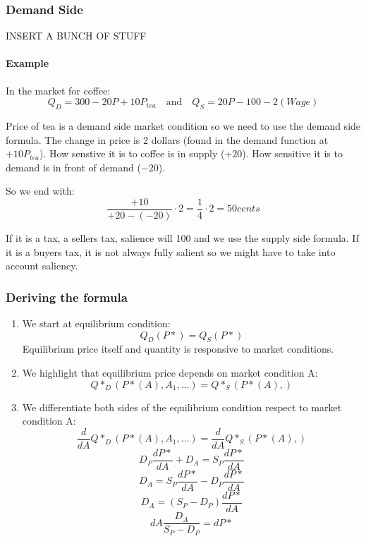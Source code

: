 \documentclass[
]{book}
\providecommand{\tightlist}{%
  \setlength{\itemsep}{0pt}\setlength{\parskip}{0pt}}
\begin{document}
\hypertarget{demand-side}{%
\subsubsection{Demand Side}\label{demand-side}}

INSERT A BUNCH OF STUFF

\hypertarget{example}{%
\paragraph{Example}\label{example}}

In the market for coffee:
\[Q_D = 300 - 20P + 10P_{tea} \quad \text{and} \quad Q_S = 20P-100 - 2(Wage)\]

Price of tea is a demand side market condition so we need to use the demand side formula. The change in price is 2 dollars (found in the demand function at \(+10P_{tea}\)). How senstive it is to coffee is in supply (\(+20\)). How sensitive it is to demand is in front of demand (\(-20\)).

So we end with: \[\frac{+10}{+20 - (-20)}\cdot 2 = \frac{1}{4} \cdot 2 = 50 cents\]

If it is a tax, a sellers tax, salience will 100 and we use the supply side formula. If it is a buyers tax, it is not always fully salient so we might have to take into account saliency.

\hypertarget{deriving-the-formula}{%
\subsubsection{Deriving the formula}\label{deriving-the-formula}}

\begin{enumerate}
\def\labelenumi{\arabic{enumi}.}
\tightlist
\item
  We start at equilibrium condition:
  \[Q_D(P*) = Q_S(P*)\]
  Equilibrium price itself and quantity is responsive to market conditions.
\item
  We highlight that equilibrium price depends on market condition A: \[Q*_D(P*(A),A_1,...) = Q*_S(P*(A),)\]
\item
  We differentiate both sides of the equilibrium condition respect to market condition A: \[ \frac{d}{dA} Q*_D(P*(A),A_1,...) = \frac{d}{dA} Q*_S(P*(A),)\]
  \[D_P \frac{dP*}{dA} + D_A =  S_P \frac{dP*}{dA}\]
  \[D_A =  S_P \frac{dP*}{dA} - D_P \frac{dP*}{dA}\]
  \[D_A = (S_P - D_P)\frac{dP*}{dA}\]
  \[dA \frac{D_A}{S_P - D_P} = dP*\]
\end{enumerate}
\end{document}

